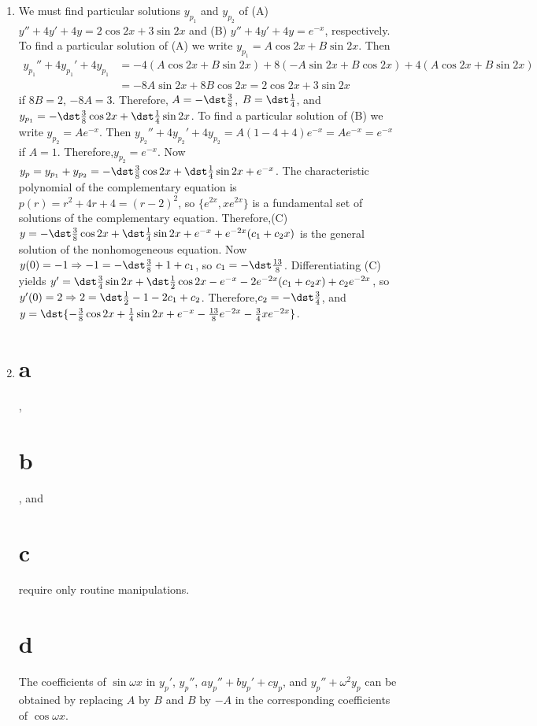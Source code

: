 \documentclass[openany]{book}
\newenvironment{sectionSolutions}{
 \begin{enumerate}[item-label={\thesection.\arabic{enumi}.}]
}{
 \end{enumerate}
}
\begin{document}
\begin{sectionSolutions}
\item
We must find particular solutions $y_{p_1}$ and $y_{p_2}$ of
(A) $y''+4y'+4y=2\cos2x+3\sin2x$ and
(B) $y''+4y'+4y=e^{-x}$,  respectively.
To find a particular solution of (A) we write
 $y_{p_1}=A\cos2x+B\sin2x$. Then
\begin{align*}
y_{p_1}''+4y_{p_1}'+4y_{p_1}
&=-4(A\cos2x+B\sin2x)+8(-A\sin2x+B\cos2x)
+4(A\cos2x+B\sin2x)\\
&=-8A\sin2x+8B\cos2x=2\cos2x+3\sin2x
\end{align*}
if $8B=2$, $-8A=3$. Therefore, $A=-\dst\frac{3}{8}$, $B=\dst\frac{1}{4}$,
and $y_{p_1}=-\dst\frac{3}{8}\cos2x+\dst\frac{1}{4}\sin2x$. To find a
particular solution of (B) we write $y_{p_2}=Ae^{-x}$. Then
$y_{p_2}''+4y_{p_2}'+4y_{p_2}=A(1-4+4)e^{-x}=Ae^{-x}=e^{-x}$ if $A=1$.
Therefore,$y_{p_2}=e^{-x}$. Now $y_p=y_{p_1}+y_{p_2}=
-\dst\frac{3}{8}\cos2x+\dst\frac{1}{4}\sin2x+e^{-x}$. The characteristic
polynomial of the complementary equation is $p(r)=r^2+4r+4=(r-2)^2$,
so $\{e^{2x},xe^{2x}\}$ is a fundamental set of solutions of the
complementary equation. Therefore,(C)
$y=-\dst\frac{3}{8}\cos2x+\dst\frac{1}{4}\sin2x+e^{-x}+e^{-2x}(c_1+c_2x)$
is the general solution of the nonhomogeneous equation. Now
$y(0)=-1\Rightarrow -1=-\dst\frac{3}{8}+1+c_1$, so
$c_1=-\dst\frac{13}{8}$. Differentiating (C) yields
$y'=\dst\frac{3}{4}\sin2x+\dst\frac{1}{2}\cos2x-e^{-x}-2e^{-2x}(c_1+c_2x)
+c_2e^{-2x}$, so $y'(0)=2\Rightarrow 2=\dst\frac{1}{2}-1-2c_1+c_2$.
Therefore,$c_2=-\dst\frac{3}{4}$, and
$y=\dst{-\frac{3}{8}\cos2x+\frac{1}{4}\sin2x+e^{-x}-\frac{13}{8}e^{-2x}-
\frac{3}{4}xe^{-2x}}$.


\item
\part{a}, \part{b}, and \part{c} require only routine
manipulations.
\part{d}
The coefficients of $\sin\omega x$ in
$y_p'$, $y_p''$, $ay_p''+by_p'+cy_p$,
and $y_p''+\omega^2 y_p$  can be obtained by replacing $A$ by $B$
and $B$ by $-A$ in the corresponding coefficients of $\cos\omega x$.




\end{sectionSolutions}
\end{document}
